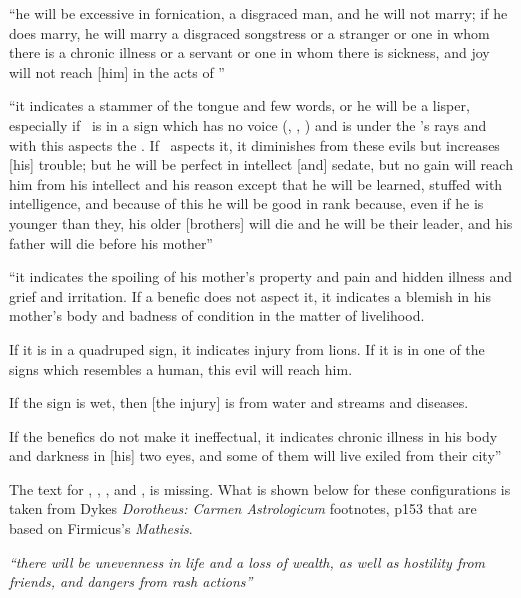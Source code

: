 \begin{description}[style=multiline,leftmargin=1.5cm]
\item[\Saturn\Opposition\Venus] ``he will be excessive in fornication, a disgraced man, and he will not marry; if he does marry, he will marry a disgraced songstress or a stranger or one in whom there is a chronic illness or a servant or one in whom there is sickness, and joy will not reach [him] in the acts of \Venus''

\item[\Saturn\Opposition\Mercury] ``it indicates a stammer of the tongue and few words, or he will be a lisper, especially if \Mercury\, is in a sign which has no voice (\Cancer, \Scorpio, \Pisces) and is under the \Sun's rays and with this aspects the \Moon. If \Mars\, aspects it, it diminishes from these evils but increases [his] trouble; but he will be perfect in intellect [and] sedate, but no gain will reach him from his intellect and his reason except that he will be learned, stuffed with intelligence, and because of this he will be good in rank because, even if he is younger than they, his older [brothers] will die and he will be their leader, and his father will die before his mother''

\item[\Saturn\Opposition\Moon]
``it indicates the spoiling of his mother's property and pain and hidden illness and grief and irritation. If a benefic does not aspect
it, it indicates a blemish in his mother's body and badness of condition in the matter of livelihood. 

If it is in a quadruped sign, it indicates injury from lions. If it is in one of the signs which resembles a human, this evil will reach him. 

If the sign is wet, then [the injury] is from water and streams and diseases. 

If the benefics do not make it ineffectual, it indicates chronic illness in his body and darkness in [his] two eyes, and some of them will  live exiled from their city''

\begin{mdframed}[backgroundcolor=cyan!5, rightmargin=1em, leftmargin=1em]
The text for \Jupiter\Opposition\Mars, \Sun, \Venus, and \Mercury, is missing. What is shown below for these configurations is taken from Dykes \textsl{Dorotheus: Carmen Astrologicum} footnotes, p153 that are based on Firmicus's \textsl{Mathesis}.
\end{mdframed}

\item[\Jupiter\Opposition\Mars] \textsl{``there will be unevenness in life and a loss of wealth, as well as hostility from friends, and dangers from rash actions''}


\end{description}
